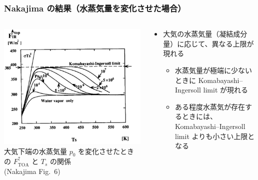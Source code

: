 \documentclass[aspectratio=149,9pt]{beamer}
\newcommand{\hmTOA}{\mathrm{TOA}}
\begin{document}
\begin{frame}
	\frametitle{Nakajima \etal の結果（水蒸気量を変化させた場合）}
	\begin{columns}[c]
		\begin{column}{.6\textwidth}
			\centering\scriptsize
			\includegraphics[width=\textwidth]{nakajima6.png}\\
			大気下端の水蒸気量 \(p_0\) を変化させたときの \(F^\uparrow_\hmTOA\) と \(T_s\) の関係\\
			(Nakajima \etal Fig.~6)
		\end{column}
		\begin{column}{.4\textwidth}
			\begin{itemize}
				\item 大気の水蒸気量（凝結成分量）に応じて、異なる上限が現れる
					\begin{itemize}
						\item 水蒸気量が極端に少ないときに Komabayashi--Ingersoll limit
							が現れる
						\item ある程度水蒸気が存在するときには、Komabayashi--Ingersoll limit
							よりも小さい上限となる
					\end{itemize}
			\end{itemize}
		\end{column}
	\end{columns}
\end{frame}
\end{document}
